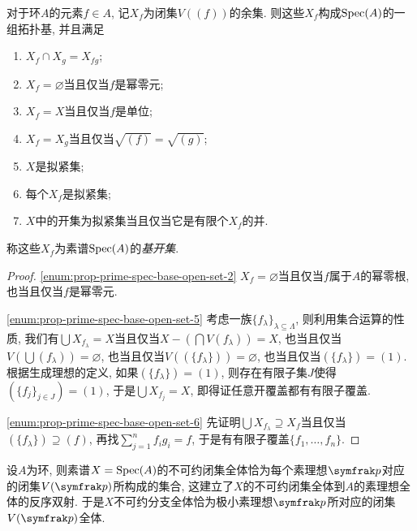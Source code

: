\begin{proposition}\label{prop:primespecbaseopenset}
  对于环$A$的元素$f\in A$, 记$X_f$为闭集$V((f))$的余集. 则这些$X_f$构成$\operatorname{Spec} (A)$的一组拓扑基, 并且满足
  \begin{enumerate}
    \item $X_f\cap X_g=X_{fg}$;
    \item\label{enum:prop-prime-spec-base-open-set-2} $X_f=\varnothing$当且仅当$f$是幂零元;
    \item $X_f=X$当且仅当$f$是单位;
    \item $X_f=X_g$当且仅当$\sqrt{(f)}=\sqrt{(g)}$;
    \item\label{enum:prop-prime-spec-base-open-set-5} $X$是拟紧集\footnotemark;
    \item\label{enum:prop-prime-spec-base-open-set-6} 每个$X_f$是拟紧集;
    \item $X$中的开集为拟紧集当且仅当它是有限个$X_f$的并.
  \end{enumerate}
  称这些$X_f$为素谱$\operatorname{Spec} (A)$的\emph{基开集}.
\end{proposition}

\begin{proof}
  \ref{enum:prop-prime-spec-base-open-set-2} $X_f=\varnothing$当且仅当$f$属于$A$的幂零根, 也当且仅当$f$是幂零元.

  \ref{enum:prop-prime-spec-base-open-set-5} 考虑一族$\{f_\lambda\}_{\lambda\subseteq \Lambda}$, 则利用集合运算的性质, 我们有$\bigcup X_{f_\lambda}=X$当且仅当$X-(\bigcap V(f_\lambda))=X$, 也当且仅当$V(\bigcup (f_\lambda))=\varnothing$, 也当且仅当$V((\{f_\lambda\}))=\varnothing$, 也当且仅当$(\{f_\lambda\})=(1)$. 根据生成理想的定义, 如果$(\{f_\lambda\})=(1)$, 则存在有限子集$J$使得$(\{f_j\}_{j\in J})=(1)$, 于是$\bigcup X_{f_j}=X$, 即得证任意开覆盖都有有限子覆盖.

  \ref{enum:prop-prime-spec-base-open-set-6} 先证明$\bigcup X_{f_\lambda}\supseteq X_f$当且仅当$(\{f_\lambda\})\supseteq (f)$, 再找$\sum_{j=1}^n f_ig_i = f$, 于是有有限子覆盖$\{f_1, \dotsc, f_n\}$.
\end{proof}

\begin{proposition}
  设$A$为环, 则素谱$X=\operatorname{Spec} (A)$的不可约闭集全体恰为每个素理想$\ideal{p}$对应的闭集$V(\ideal{p})$所构成的集合, 这建立了$X$的不可约闭集全体到$A$的素理想全体的反序双射. 于是$X$不可约分支全体恰为极小素理想$\ideal{p}$所对应的闭集$V(\ideal{p})$全体.
\end{proposition}


